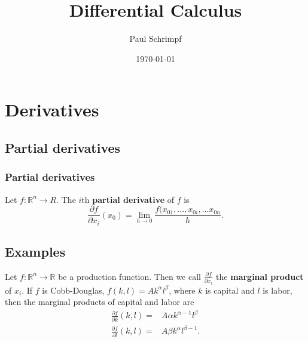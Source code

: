 \documentclass[compress]{beamer}
\title{Differential Calculus}
\author{Paul Schrimpf}
\institute{UBC \\ Economics 526}
\date{\today}
\def\R{\mathbb{R}}
\renewcommand{\to}{{\rightarrow}}
\begin{document}
\frame{\titlepage}



\begin{frame}
  \tableofcontents  
\end{frame}

\section{Derivatives}

\subsection{Partial derivatives}
\begin{frame}
  \frametitle{Partial derivatives}
  \begin{definition}
    Let $f:\R^n \to R$. The $i$th \textbf{partial derivative} of $f$ is 
    \[ \frac{\partial f}{\partial x_i} (x_0) = \lim_{h \to 0}
    \frac{f(x_{01},...,x_{0i}, ... x_{0n}}{h}. \]
  \end{definition}
\end{frame}
\subsection{Examples}
\begin{frame}
\begin{example}
  Let $f:\R^n \to \R$ be a production function. Then we call
  $\frac{\partial f}{\partial x_i}$ the \textbf{marginal product} of
  $x_i$. If $f$ is Cobb-Douglas, $f(k,l) = Ak^\alpha l^\beta$, where
  $k$ is capital and $l$ is labor, then the marginal products of
  capital and labor are
  \begin{align*}
    \frac{\partial f}{\partial k} (k,l) = & A \alpha k^{\alpha-1}
    l^\beta \\
    \frac{\partial f}{\partial l} (k,l) = & A \beta k^{\alpha}
    l^{\beta -1}.
  \end{align*}
\end{example}
\end{frame}
\end{document}
